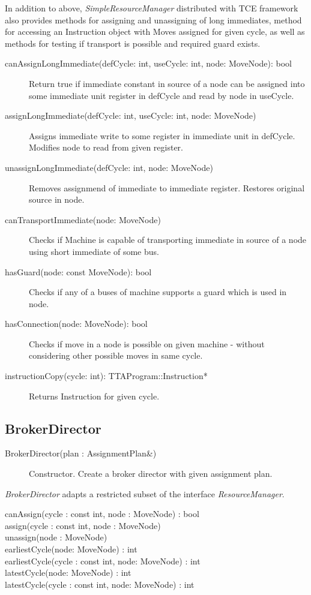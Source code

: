 \documentclass[a4paper,twoside]{tce}
\begin{document}
In addition to above, \emph{SimpleResourceManager} distributed with TCE framework
also provides methods for assigning and unassigning of long immediates, method for
accessing an Instruction object with Moves assigned for given cycle, as well as
methods for testing if transport is possible and required guard exists.
\begin{description}
    \item [canAssignLongImmediate(defCycle: int, useCycle: int, node: MoveNode): bool]
	Return true if immediate constant in source of a node can be assigned into
	some immediate unit register in defCycle and read by node in useCycle.
    \item[assignLongImmediate(defCycle: int, useCycle: int, node: MoveNode)]
	Assigns immediate write to some register in immediate unit in defCycle. 
	Modifies node to read from given register.
    \item[unassignLongImmediate(defCycle: int, node: MoveNode)]
	Removes assignmend of immediate to immediate register. Restores original
	source in node.
    \item[canTransportImmediate(node: MoveNode)]
	Checks if Machine is capable of transporting immediate in source of a node
	using short immediate of some bus.
    \item[hasGuard(node: const MoveNode): bool]
	Checks if any of a buses of machine supports a guard which is used
	in node.
    \item[hasConnection(node: MoveNode): bool]
	Checks if move in a node is possible on given machine - without
	considering other possible moves in same cycle.
    \item[instructionCopy(cycle: int): TTAProgram::Instruction*]
	Returns Instruction for given cycle.
\end{description}

\subsection{BrokerDirector}
\label{ssec:BrokerDirector-if}

\begin{description}
\item[BrokerDirector(plan : AssignmentPlan\&)]%
  Constructor. Create a broker director with given assignment plan.
\end{description}

\emph{BrokerDirector} adapts a restricted subset of the interface
\emph{ResourceManager}.

\begin{description}
\item[canAssign(cycle : const int, node : MoveNode) : bool]%
\item[assign(cycle : const int, node : MoveNode)]%
\item[unassign(node : MoveNode)]%
\item[earliestCycle(node: MoveNode) : int]%
\item[earliestCycle(cycle : const int, node: MoveNode) : int]%
\item[latestCycle(node: MoveNode) : int]%
\item[latestCycle(cycle : const int, node: MoveNode) : int]%
\end{description}
\end{document}
